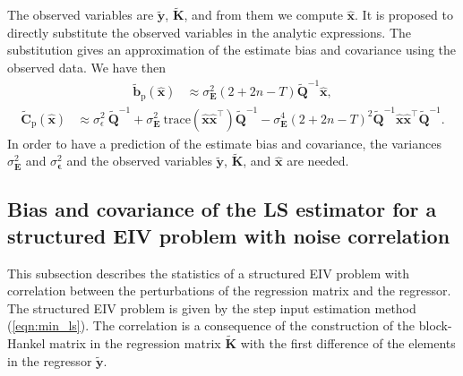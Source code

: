 The observed variables are $\widetilde{\mathbf{y}}$, $\widetilde{\mathbf{K}}$, and from them we compute $\widehat{\mathbf{x}}$.
It is proposed to directly substitute the observed variables in the analytic expressions.
The substitution gives an approximation of the estimate bias and covariance using the observed data.
We have then
\begin{equation} \begin{aligned} \widetilde{\mathbf{b}}_{\mathrm{p}} \left( \widehat{\mathbf{x}} \right) & \approx \sigma_{\mathbf{E}}^2 \left( 2 + 2n - T \right) \widetilde{\mathbf{Q}}^{-1} \widehat{\mathbf{x}} , \end{aligned} \label{eqn:biasEuST} \end{equation}
\begin{equation} \begin{aligned} \widetilde{\mathbf{C}}_{\mathrm{p}} \left( \widehat{\mathbf{x}} \right) & \approx \sigma_\epsilon^2 \ \widetilde{\mathbf{Q}}^{-1} + \sigma_{\mathbf{E}}^2 \ \mathrm{trace} \left( \widehat{\mathbf{x}} \widehat{\mathbf{x}}^\top \right) \widetilde{\mathbf{Q}}^{-1} - \sigma_{\mathbf{E}}^4 \left( 2 + 2n - T \right)^2 \widetilde{\mathbf{Q}}^{-1} \widehat{\mathbf{x}} \widehat{\mathbf{x}}^\top \widetilde{\mathbf{Q}}^{-1} . \end{aligned} \label{eqn:varEuST} \end{equation}
In order to have a prediction of the estimate bias and covariance, the variances $\sigma_{\mathbf{E}}^2$ and $\sigma_{\bm{\epsilon}}^2$ and the observed variables $\widetilde{\mathbf{y}}$, $\widetilde{\mathbf{K}}$, and $\widehat{\mathbf{x}}$ are needed.


\subsection{Bias and covariance of the LS estimator for a structured EIV problem with noise correlation}

This subsection describes the statistics of a structured EIV problem with correlation between the perturbations of the regression matrix and the regressor. 
The structured EIV problem is given by the step input estimation method (\ref{eqn:min_ls}).
The correlation is a consequence of the construction of the block-Hankel matrix in the regression matrix $\widetilde{\mathbf{K}}$ with the first difference of the elements in the regressor $\widetilde{\mathbf{y}}$.

